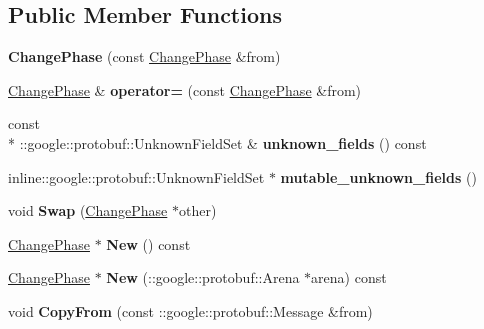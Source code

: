 \subsection*{Public Member Functions}
\begin{DoxyCompactItemize}
\item 
\hypertarget{class_change_phase_a4b9f1307f5e414f9e31028593df82821}{{\bfseries Change\-Phase} (const \hyperlink{class_change_phase}{Change\-Phase} \&from)}\label{class_change_phase_a4b9f1307f5e414f9e31028593df82821}

\item 
\hypertarget{class_change_phase_afe1b8fb71c597241a130e5a0361084ff}{\hyperlink{class_change_phase}{Change\-Phase} \& {\bfseries operator=} (const \hyperlink{class_change_phase}{Change\-Phase} \&from)}\label{class_change_phase_afe1b8fb71c597241a130e5a0361084ff}

\item 
\hypertarget{class_change_phase_a35fed0c7a4fe24a8aa7fdeedde702f25}{const \\*
\-::google\-::protobuf\-::\-Unknown\-Field\-Set \& {\bfseries unknown\-\_\-fields} () const }\label{class_change_phase_a35fed0c7a4fe24a8aa7fdeedde702f25}

\item 
\hypertarget{class_change_phase_ae7bdf30321b4858a0947396ed19a8d9c}{inline\-::google\-::protobuf\-::\-Unknown\-Field\-Set $\ast$ {\bfseries mutable\-\_\-unknown\-\_\-fields} ()}\label{class_change_phase_ae7bdf30321b4858a0947396ed19a8d9c}

\item 
\hypertarget{class_change_phase_a4be33194d239e28dd0aecaf4d836a809}{void {\bfseries Swap} (\hyperlink{class_change_phase}{Change\-Phase} $\ast$other)}\label{class_change_phase_a4be33194d239e28dd0aecaf4d836a809}

\item 
\hypertarget{class_change_phase_a9c62cc118ada96ab07093b542f54f651}{\hyperlink{class_change_phase}{Change\-Phase} $\ast$ {\bfseries New} () const }\label{class_change_phase_a9c62cc118ada96ab07093b542f54f651}

\item 
\hypertarget{class_change_phase_af8041c1ea9d514c054ff97dea9691413}{\hyperlink{class_change_phase}{Change\-Phase} $\ast$ {\bfseries New} (\-::google\-::protobuf\-::\-Arena $\ast$arena) const }\label{class_change_phase_af8041c1ea9d514c054ff97dea9691413}

\item 
\hypertarget{class_change_phase_aaa00056e07d103185fb7d3c9b2c80c89}{void {\bfseries Copy\-From} (const \-::google\-::protobuf\-::\-Message \&from)}\label{class_change_phase_aaa00056e07d103185fb7d3c9b2c80c89}


\end{DoxyCompactItemize}
